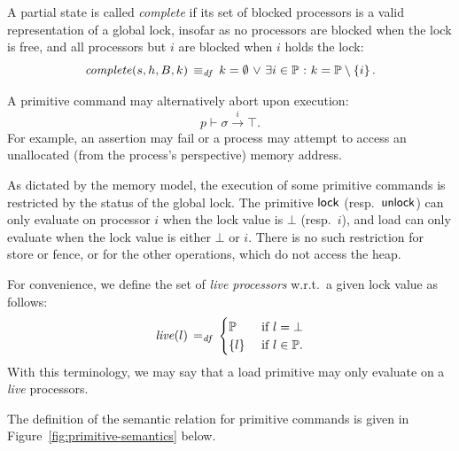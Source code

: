 \documentclass[11pt]{article}
\begin{document}
A partial state is called \emph{complete} if its set of blocked processors is a valid representation of a global lock, insofar as no processors are blocked when the lock is free, and all processors but $i$ are blocked when $i$ holds the lock: \[ \mathit{complete}(s,h,B,k) \operatorname{\;\equiv_{\mathit{df}}\;} k = \operatorname{\emptyset} \operatorname{\,\vee\,} \exists i \in \mathbb{P} \operatorname{\,:\,} k = \mathbb{P} \setminus \left\lbrace i \right\rbrace.\]

A primitive command may alternatively abort upon execution: \[ p \vdash \sigma \stackrel{i}{\rightarrow} \top. \] For example, an assertion may fail or a process may attempt to access an unallocated (from the process's perspective) memory address. 

As dictated by the memory model, the execution of some primitive commands is restricted by the status of the global lock. The primitive $\operatorname{\mathsf{lock}}$ (resp.~$\operatorname{\mathsf{unlock}}$) can only evaluate on processor $i$ when the lock value is $\bot$ (resp.~$i$), and load can only evaluate when the lock value is either $\bot$ or $i$. There is no such restriction for store or fence, or for the other operations, which do not access the heap. 

For convenience, we define the set of \emph{live processors} w.r.t.~a given lock value as follows: \[ \mathit{live}(l) \operatorname{\;=_{\mathit{df}}\;} \begin{cases}
	\mathbb{P} &\text{ if } l = \bot\\
	\left\lbrace l \right\rbrace &\text{ if } l \in \mathbb{P}.
\end{cases}\] With this terminology, we may say that a load primitive may only evaluate on a \emph{live} processors. 

The definition of the semantic relation for primitive commands is given in Figure~\ref{fig:primitive-semantics} below. 
\end{document}
